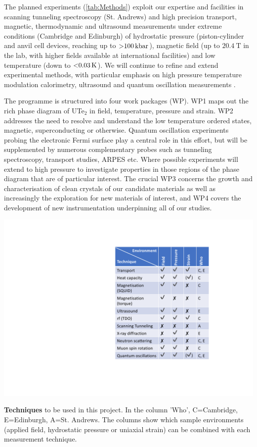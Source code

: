 The planned experiments (\autoref{tab:Methods}) exploit our expertise and facilities in scanning tunneling spectroscopy (St. Andrews) and high precision transport, magnetic, thermodynamic and ultrasound measurements under extreme conditions (Cambridge and Edinburgh) of hydrostatic pressure (piston-cylinder and anvil cell devices, reaching up to $\SI{>100}{\kilo\bar}$), magnetic field (up to $\SI{20.4}{\tesla}$ in the lab, with higher fields available at international facilities) and low temperature (down to $\SI{<0.03}{\kelvin}$). We will continue to refine and extend experimental methods, with particular emphasis on high pressure temperature modulation calorimetry, ultrasound and quantum oscillation measurements  .  %

The programme is structured into four work packages (WP). WP1 maps out the rich phase diagram of UTe$_2$ in field, temperature, pressure and strain. WP2 addresses the need to resolve and understand the low temperature ordered states, magnetic, superconducting or otherwise. Quantum oscillation experiments probing the electronic Fermi surface play a central role in this effort, but will be supplemented by numerous complementary probes such as tunneling spectroscopy, transport studies, ARPES etc. Where possible experiments will extend to high pressure to investigate properties in those regions of the phase diagram that are of particular interest. The crucial WP3 concerns the growth and characterisation of clean crystals of our candidate materials as well as increasingly the exploration for new materials of interest, and WP4 covers the development of new instrumentation underpinning all of our studies. 


\begin{table}
  \centerline{\includegraphics[width=0.7\columnwidth]{Figures/MethodsTable.pdf}}
  \caption{{\bf Techniques} to be used in this project. In the column 'Who', C=Cambridge, E=Edinburgh, A=St. Andrews. The columns show which sample environments (applied field, hydrostatic pressure or uniaxial strain) can be combined with each measurement technique. }
  \label{tab:Methods}
\end{table}

